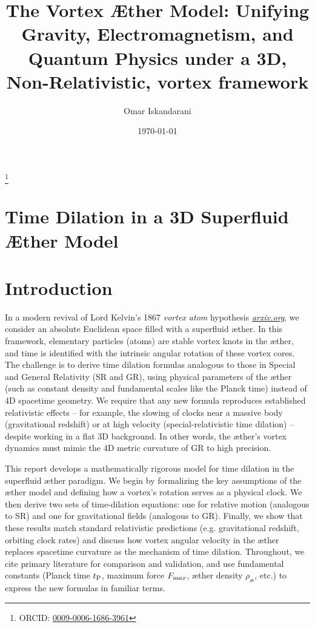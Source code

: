 \documentclass[aps,preprint,superscriptaddress]{revtex4}
\begin{document}
    \author{Omar Iskandarani}
    \title{The Vortex Æther Model: Unifying Gravity, Electromagnetism, and Quantum Physics under a 3D, Non-Relativistic, vortex framework}
    \date{\today}
    \thanks{ORCID: \href{https://orcid.org/0009-0006-1686-3961}{0009-0006-1686-3961}}




    \section*{Time Dilation in a 3D Superfluid Æther Model}

    \section*{Introduction}

    In a modern revival of Lord Kelvin’s 1867 \textit{vortex atom} hypothesis
    \href{https://arxiv.org/pdf/2012.07395#:~:text=Thomson%20,on%20the%20right%20path%20when}{\textit{arxiv.org}}, we consider an absolute Euclidean space filled with a superfluid æther. In this framework, elementary particles (atoms) are stable vortex knots in the æther, and time is identified with the intrinsic angular rotation of these vortex cores. The challenge is to derive time dilation formulas analogous to those in Special and General Relativity (SR and GR), using physical parameters of the æther (such as constant density and fundamental scales like the Planck time) instead of 4D spacetime geometry. We require that any new formula reproduces established relativistic effects – for example, the slowing of clocks near a massive body (gravitational redshift) or at high velocity (special-relativistic time dilation) – despite working in a flat 3D background. In other words, the æther’s vortex dynamics must mimic the 4D metric curvature of GR to high precision.

    This report develops a mathematically rigorous model for time dilation in the superfluid æther paradigm. We begin by formalizing the key assumptions of the æther model and defining how a vortex’s rotation serves as a physical clock. We then derive two sets of time-dilation equations: one for relative motion (analogous to SR) and one for gravitational fields (analogous to GR). Finally, we show that these results match standard relativistic predictions (e.g. gravitational redshift, orbiting clock rates) and discuss how vortex angular velocity in the æther replaces spacetime curvature as the mechanism of time dilation. Throughout, we cite primary literature for comparison and validation, and use fundamental constants (Planck time $t_{\textrm P}$, maximum force $F_{\textrm max}$, æther density $\rho_{\text{\ae}}$, etc.) to express the new formulas in familiar terms.
\end{document}
